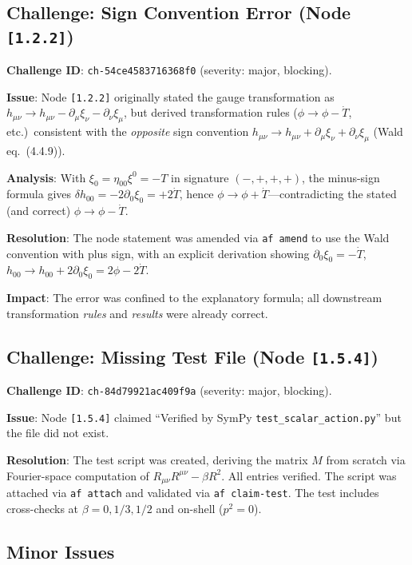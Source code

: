\documentclass[11pt,a4paper]{article}
\newcommand{\p}{\partial}
\newcommand{\afnode}[1]{\texttt{[#1]}}
\begin{document}
\subsection{Challenge: Sign Convention Error (Node \afnode{1.2.2})}
\label{sec:challenge122}

\textbf{Challenge ID}: \texttt{ch-54ce4583716368f0} (severity: major, blocking).

\textbf{Issue}: Node \afnode{1.2.2} originally stated the gauge transformation as
$h_{\mu\nu} \to h_{\mu\nu} - \p_\mu\xi_\nu - \p_\nu\xi_\mu$, but derived
transformation rules ($\phi \to \phi - \dot{T}$, etc.)\ consistent with the
\emph{opposite} sign convention $h_{\mu\nu} \to h_{\mu\nu} + \p_\mu\xi_\nu + \p_\nu\xi_\mu$
(Wald eq.~(4.4.9)).

\textbf{Analysis}: With $\xi_0 = \eta_{00}\xi^0 = -T$ in signature $(-,+,+,+)$,
the minus-sign formula gives $\delta h_{00} = -2\p_0\xi_0 = +2\dot{T}$, hence
$\phi \to \phi + \dot{T}$---contradicting the stated (and correct)
$\phi \to \phi - \dot{T}$.

\textbf{Resolution}: The node statement was amended via \texttt{af amend} to use
the Wald convention with plus sign, with an explicit derivation showing
$\p_0\xi_0 = -\dot{T}$, $h_{00} \to h_{00} + 2\p_0\xi_0 = 2\phi - 2\dot{T}$.

\textbf{Impact}: The error was confined to the explanatory formula; all downstream
transformation \emph{rules} and \emph{results} were already correct.

\subsection{Challenge: Missing Test File (Node \afnode{1.5.4})}
\label{sec:challenge154}

\textbf{Challenge ID}: \texttt{ch-84d79921ac409f9a} (severity: major, blocking).

\textbf{Issue}: Node \afnode{1.5.4} claimed ``Verified by SymPy
\texttt{test\_scalar\_action.py}'' but the file did not exist.

\textbf{Resolution}: The test script was created, deriving the matrix $M$ from
scratch via Fourier-space computation of $R_{\mu\nu}R^{\mu\nu} - \beta R^2$.
All entries verified. The script was attached via \texttt{af attach} and
validated via \texttt{af claim-test}. The test includes cross-checks at
$\beta = 0, 1/3, 1/2$ and on-shell ($p^2 = 0$).

\subsection{Minor Issues}
\end{document}
